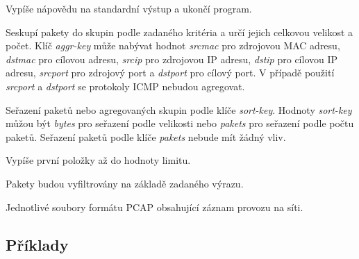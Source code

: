 \documentclass[11pt, a4paper]{article}
\begin{document}
\begin{description}[style=multiline,leftmargin=3.5cm]

\item[-h] Vypíše nápovědu na standardní výstup a ukončí program.
\item[-a aggr-key] Seskupí pakety do skupin podle zadaného kritéria a určí jejich celkovou velikost a počet. Klíč \emph{aggr-key} může nabývat hodnot \emph{srcmac} pro zdrojovou MAC adresu, \emph{dstmac} pro cílovou adresu, \emph{srcip} pro zdrojovou IP adresu, \emph{dstip} pro cílovou IP adresu, \emph{srcport} pro zdrojový port a \emph{dstport} pro cílový port. V případě použití \emph{srcport} a \emph{dstport} se protokoly ICMP nebudou agregovat.
\item[-s sort-key] Seřazení paketů nebo agregovaných skupin podle klíče \emph{sort-key}. Hodnoty \emph{sort-key} mů\-žou být \emph{bytes} pro seřazení podle velikosti nebo \emph{pakets} pro seřazení podle počtu paketů. Seřazení paketů podle klíče \emph{pakets} nebude mít žádný vliv.
\item[-l limit] Vypíše první položky až do hodnoty limitu.
\item[-f filter-expression] Pakety budou vyfiltrovány na základě zadaného výrazu.
\item[file] Jednotlivé soubory formátu PCAP obsahující záznam provozu na síti.

\end{description}

\subsection{Příklady}
\end{document}
